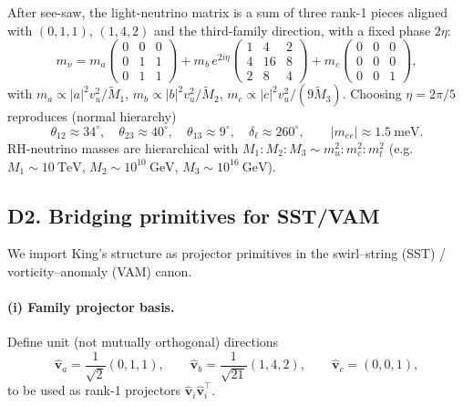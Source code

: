 \documentclass[11pt]{article}
\begin{document}
          After see-saw, the light-neutrino matrix is a sum of three rank-1 pieces aligned
          with $(0,1,1)$, $(1,4,2)$ and the third-family direction, with a fixed phase $2\eta$:
          \begin{equation}\label{eq:D_rank1}
          m_\nu
          = m_a\!\begin{pmatrix}0&0&0\\0&1&1\\0&1&1\end{pmatrix}
          + m_b\, e^{2i\eta}\!\begin{pmatrix}1&4&2\\4&16&8\\2&8&4\end{pmatrix}
          + m_c\!\begin{pmatrix}0&0&0\\0&0&0\\0&0&1\end{pmatrix},
          \end{equation}
          with $m_a\propto |a|^2 v_u^2/\tilde M_1$, $m_b\propto |b|^2 v_u^2/\tilde M_2$, $m_c\propto |c|^2 v_u^2/(9\tilde M_3)$.
          Choosing $\eta=2\pi/5$ reproduces (normal hierarchy)
          \[
              \theta_{12}\!\approx\!34^\circ,\quad \theta_{23}\!\approx\!40^\circ,\quad
              \theta_{13}\!\approx\!9^\circ,\quad \delta_\ell\!\approx\!260^\circ,\qquad
              |m_{ee}|\!\approx\!1.5~\mathrm{meV}.
          \]
          RH-neutrino masses are hierarchical with $M_1\!:\!M_2\!:\!M_3\sim m_u^2:m_c^2:m_t^2$ (e.g.\ $M_1\!\sim\!10~\mathrm{TeV}$, $M_2\!\sim\!10^{10}~\mathrm{GeV}$, $M_3\!\sim\!10^{16}~\mathrm{GeV}$).

      \subsection*{D2. Bridging primitives for SST/VAM}
          We import King’s structure as projector primitives in the swirl–string (SST) / vorticity–anomaly (VAM) canon.

          \paragraph{(i) Family projector basis.}
              Define unit (not mutually orthogonal) directions
              \begin{equation}
              \hat{\mathbf v}_a=\frac{1}{\sqrt{2}}(0,1,1),\qquad
              \hat{\mathbf v}_b=\frac{1}{\sqrt{21}}(1,4,2),\qquad
              \hat{\mathbf v}_c=(0,0,1),
              \end{equation}
              to be used as rank-1 projectors $\hat{\mathbf v}_i\hat{\mathbf v}_i^{\!\top}$.
\end{document}
